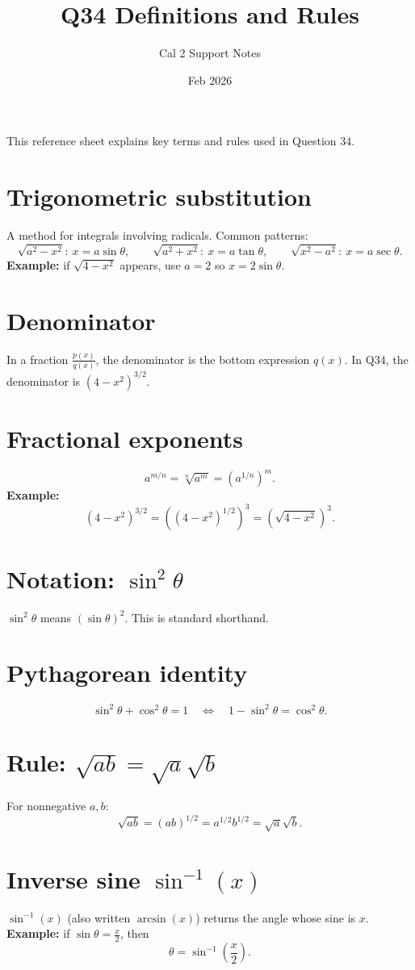 \documentclass{article}
\title{Q34 Definitions and Rules}
\author{Cal 2 Support Notes}
\date{Feb 2026}
\begin{document}
\maketitle

This reference sheet explains key terms and rules used in Question 34.

\section*{Trigonometric substitution}
A method for integrals involving radicals. Common patterns:
\[
\sqrt{a^2-x^2}:\ x=a\sin\theta,\qquad
\sqrt{a^2+x^2}:\ x=a\tan\theta,\qquad
\sqrt{x^2-a^2}:\ x=a\sec\theta.
\]
\textbf{Example:} if $\sqrt{4-x^2}$ appears, use $a=2$ so $x=2\sin\theta$.

\section*{Denominator}
In a fraction $\frac{p(x)}{q(x)}$, the denominator is the bottom expression $q(x)$.
In Q34, the denominator is $(4-x^2)^{3/2}$.

\section*{Fractional exponents}
\[
a^{m/n}=\sqrt[n]{a^m}=\left(a^{1/n}\right)^m.
\]
\textbf{Example:}
\[
(4-x^2)^{3/2}=\left((4-x^2)^{1/2}\right)^3=\left(\sqrt{4-x^2}\right)^3.
\]

\section*{Notation: $\sin^2\theta$}
$\sin^2\theta$ means $(\sin\theta)^2$. This is standard shorthand.

\section*{Pythagorean identity}
\[
\sin^2\theta+\cos^2\theta=1
\quad\Longleftrightarrow\quad
1-\sin^2\theta=\cos^2\theta.
\]

\section*{Rule: $\sqrt{ab}=\sqrt a\sqrt b$}
For nonnegative $a,b$:
\[
\sqrt{ab}=(ab)^{1/2}=a^{1/2}b^{1/2}=\sqrt a\sqrt b.
\]

\section*{Inverse sine $\sin^{-1}(x)$}
$\sin^{-1}(x)$ (also written $\arcsin(x)$) returns the angle whose sine is $x$.
\textbf{Example:} if $\sin\theta=\frac{x}{2}$, then
\[
\theta=\sin^{-1}\!\left(\frac{x}{2}\right).
\]
\end{document}
